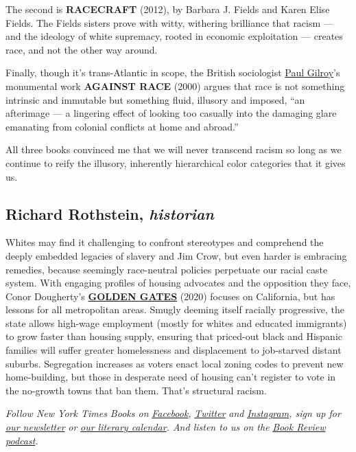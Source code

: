 The second is \textbf{RACECRAFT} (2012), by Barbara J. Fields and Karen
Elise Fields. The Fields sisters prove with witty, withering brilliance
that racism --- and the ideology of white supremacy, rooted in economic
exploitation --- creates race, and not the other way around.

Finally, though it's trans-Atlantic in scope, the British sociologist
\href{https://www.nytimes.com/2019/03/14/arts/paul-gilroy-holberg-prize.html}{Paul
Gilroy}'s monumental work \textbf{AGAINST RACE} (2000) argues that race
is not something intrinsic and immutable but something fluid, illusory
and imposed, ``an afterimage --- a lingering effect of looking too
casually into the damaging glare emanating from colonial conflicts at
home and abroad.''

All three books convinced me that we will never transcend racism so long
as we continue to reify the illusory, inherently hierarchical color
categories that it gives us.

\hypertarget{richard-rothstein-historian}{%
\subsection{\texorpdfstring{Richard Rothstein,
\emph{historian}}{Richard Rothstein, historian}}\label{richard-rothstein-historian}}

Whites may find it challenging to confront stereotypes and comprehend
the deeply embedded legacies of slavery and Jim Crow, but even harder is
embracing remedies, because seemingly race-neutral policies perpetuate
our racial caste system. With engaging profiles of housing advocates and
the opposition they face, Conor Dougherty's
\textbf{\href{https://www.nytimes.com/2020/02/14/books/review/golden-gates-housing-conor-dougherty.html}{GOLDEN
GATES}} (2020) focuses on California, but has lessons for all
metropolitan areas. Smugly deeming itself racially progressive, the
state allows high-wage employment (mostly for whites and educated
immigrants) to grow faster than housing supply, ensuring that priced-out
black and Hispanic families will suffer greater homelessness and
displacement to job-starved distant suburbs. Segregation increases as
voters enact local zoning codes to prevent new home-building, but those
in desperate need of housing can't register to vote in the no-growth
towns that ban them. That's structural racism.

\emph{Follow New York Times Books on}
\href{https://www.facebook.com/nytbooks/}{\emph{Facebook}}\emph{,}
\href{https://twitter.com/nytimesbooks}{\emph{Twitter}} \emph{and}
\href{https://www.instagram.com/nytbooks/}{\emph{Instagram}}\emph{, sign
up for}
\href{https://www.nytimes.com/newsletters/books-review}{\emph{our
newsletter}} \emph{or}
\href{https://www.nytimes.com/interactive/2017/books/books-calendar.html}{\emph{our
literary calendar}}\emph{. And listen to us on the}
\href{https://www.nytimes.com/column/book-review-podcast}{\emph{Book
Review podcast}}\emph{.}

